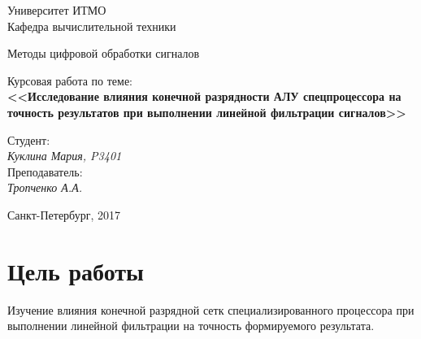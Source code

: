 \documentclass[12pt, a4paper] {ncc}
\begin{document}
\setcounter{figure}{0}
\frenchspacing
\pagestyle{empty}
\begin{center}
							Университет ИТМО	\\
                        Кафедра вычислительной техники

                    Методы цифровой обработки сигналов
\end{center}
\begin{center}
                            Курсовая работа по теме:\\
						{\bf <<Исследование влияния конечной разрядности АЛУ спецпроцессора
						 на точность результатов при выполнении линейной фильтрации сигналов>>}
\end{center}
\begin{flushright}
                                    Студент:\\
                                    {\it Куклина Мария, P3401}\\
									Преподаватель: \\
									{\it Тропченко А.А.}
\end{flushright}
\begin{center}
                             Санкт-Петербург, 2017
\end{center}
\newpage

\section*{Цель работы}

Изучение влияния конечной разрядной сетк специализированного процессора при выполнении
линейной фильтрации на точность формируемого результата.
\end{document}
